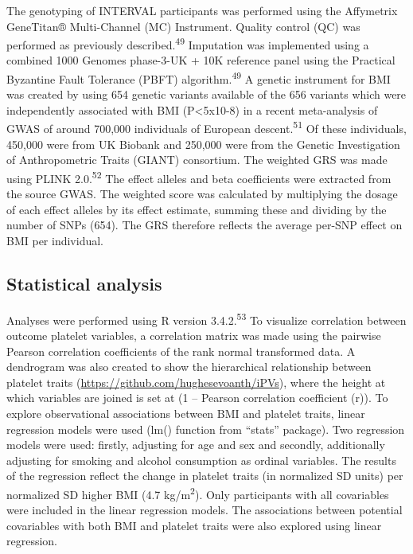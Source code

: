 \documentclass[11pt,twoside]{bristolthesis}
\begin{document}
The genotyping of INTERVAL participants was performed using the Affymetrix GeneTitan® Multi-Channel (MC) Instrument. Quality control (QC) was performed as previously described.\textsuperscript{49} Imputation was implemented using a combined 1000 Genomes phase-3-UK + 10K reference panel using the Practical Byzantine Fault Tolerance (PBFT) algorithm.\textsuperscript{49} A genetic instrument for BMI was created by using 654 genetic variants available of the 656 variants which were independently associated with BMI (P\textless5x10-8) in a recent meta-analysis of GWAS of around 700,000 individuals of European descent.\textsuperscript{51} Of these individuals, 450,000 were from UK Biobank and 250,000 were from the Genetic Investigation of Anthropometric Traits (GIANT) consortium. The weighted GRS was made using PLINK 2.0.\textsuperscript{52} The effect alleles and beta coefficients were extracted from the source GWAS. The weighted score was calculated by multiplying the dosage of each effect alleles by its effect estimate, summing these and dividing by the number of SNPs (654). The GRS therefore reflects the average per-SNP effect on BMI per individual.

\hypertarget{statistical-analysis}{%
\subsection{Statistical analysis}\label{statistical-analysis}}

Analyses were performed using R version 3.4.2.\textsuperscript{53} To visualize correlation between outcome platelet variables, a correlation matrix was made using the pairwise Pearson correlation coefficients of the rank normal transformed data. A dendrogram was also created to show the hierarchical relationship between platelet traits (\url{https://github.com/hughesevoanth/iPVs}), where the height at which variables are joined is set at (1 -- Pearson correlation coefficient (r)). To explore observational associations between BMI and platelet traits, linear regression models were used (lm() function from ``stats'' package). Two regression models were used: firstly, adjusting for age and sex and secondly, additionally adjusting for smoking and alcohol consumption as ordinal variables. The results of the regression reflect the change in platelet traits (in normalized SD units) per normalized SD higher BMI (4.7 kg/m\textsuperscript{2}). Only participants with all covariables were included in the linear regression models. The associations between potential covariables with both BMI and platelet traits were also explored using linear regression.
\end{document}
